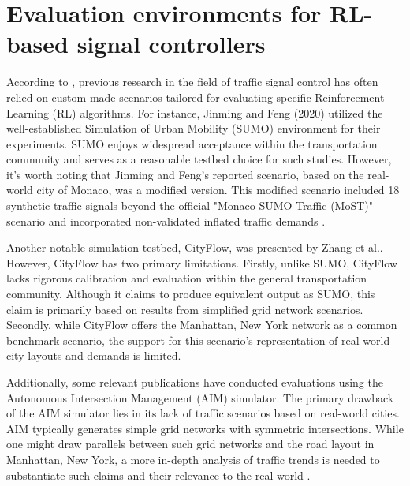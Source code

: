 \section{Evaluation environments for RL-based signal controllers}
According to \cite{resco}, previous research in the field of traffic signal control has often relied on custom-made scenarios tailored for evaluating specific Reinforcement Learning (RL) algorithms. For instance, Jinming and Feng (2020) utilized the well-established Simulation of Urban Mobility (SUMO) environment for their experiments. SUMO enjoys widespread acceptance within the transportation community and serves as a reasonable testbed choice for such studies. However, it's worth noting that Jinming and Feng's reported scenario, based on the real-world city of Monaco, was a modified version. This modified scenario included 18 synthetic traffic signals beyond the official "Monaco SUMO Traffic (MoST)" scenario and incorporated non-validated inflated traffic demands \cite{codeca2018monaco}.

Another notable simulation testbed, CityFlow, was presented by Zhang et al.\cite{zhang2019cityflow}. However, CityFlow has two primary limitations. Firstly, unlike SUMO, CityFlow lacks rigorous calibration and evaluation within the general transportation community. Although it claims to produce equivalent output as SUMO, this claim is primarily based on results from simplified grid network scenarios. Secondly, while CityFlow offers the Manhattan, New York network as a common benchmark scenario, the support for this scenario's representation of real-world city layouts and demands is limited.

Additionally, some relevant publications have conducted evaluations using the Autonomous Intersection Management (AIM) simulator. The primary drawback of the AIM simulator lies in its lack of traffic scenarios based on real-world cities. AIM typically generates simple grid networks with symmetric intersections. While one might draw parallels between such grid networks and the road layout in Manhattan, New York, a more in-depth analysis of traffic trends is needed to substantiate such claims and their relevance to the real world \cite{pham2013learning}\cite{dresner2008multiagent}\cite{ma2020feudal}.
